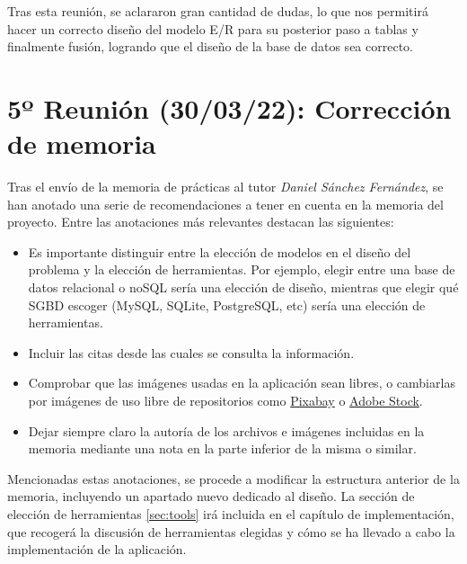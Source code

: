 Tras esta reunión, se aclararon gran cantidad de dudas, lo que nos permitirá hacer un
correcto diseño del modelo E/R para su posterior paso a tablas y finalmente fusión, logrando
que el diseño de la base de datos sea correcto.

\section{5º Reunión (30/03/22): Corrección de memoria}
Tras el envío de la memoria de prácticas al tutor \textit{Daniel Sánchez Fernández}, se
han anotado una serie de recomendaciones a tener en cuenta en la memoria del proyecto. Entre
las anotaciones más relevantes destacan las siguientes:

    \begin{itemize}
        \item Es importante distinguir entre la elección de modelos en el diseño del problema
        y la elección de herramientas. Por ejemplo, elegir entre una base de datos relacional
        o noSQL sería una elección de diseño, mientras que elegir qué SGBD escoger (MySQL,
        SQLite, PostgreSQL, etc) sería una elección de herramientas.
        \item Incluir las citas desde las cuales se consulta la información.
        \item Comprobar que las imágenes usadas en la aplicación sean libres, o cambiarlas
        por imágenes de uso libre de repositorios como \href{https://pixabay.com/}{Pixabay} o
        \href{https://stock.adobe.com/es/}{Adobe Stock}.
        \item Dejar siempre claro la autoría de los archivos e imágenes incluidas en la memoria
        mediante una nota en la parte inferior de la misma o similar.
    \end{itemize}

Mencionadas estas anotaciones, se procede a modificar la estructura anterior de la memoria,
incluyendo un apartado nuevo dedicado al diseño. La sección de elección de herramientas
\ref{sec:tools} irá incluida en el capítulo de implementación, que recogerá la discusión de
herramientas elegidas y cómo se ha llevado a cabo la implementación de la aplicación.
